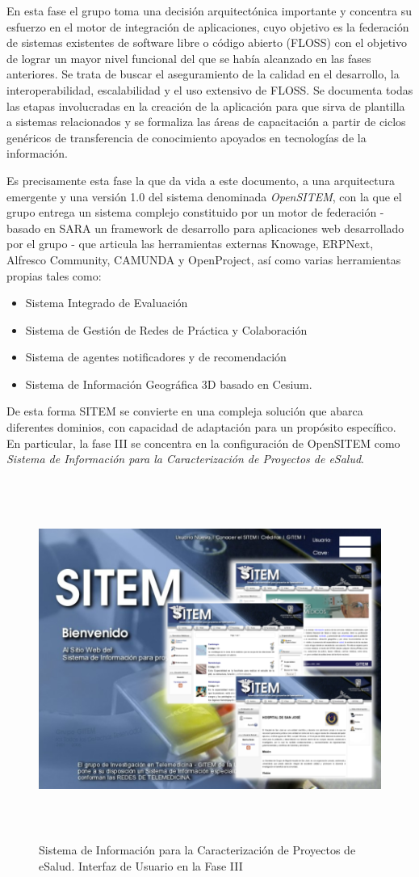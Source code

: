 En esta fase el grupo toma una decisión arquitectónica importante y concentra su esfuerzo en el motor de integración de aplicaciones, cuyo objetivo es la federación de sistemas existentes de software libre o código abierto (FLOSS) con el objetivo de lograr un mayor nivel funcional del que se había alcanzado en las fases anteriores. Se trata de buscar el aseguramiento de la calidad en el desarrollo, la interoperabilidad, escalabilidad y el uso extensivo de FLOSS. Se documenta todas las etapas involucradas en la creación de la aplicación para que sirva de plantilla a sistemas relacionados y se formaliza las áreas de capacitación a partir de ciclos genéricos de transferencia de conocimiento apoyados en tecnologías de la información.

Es precisamente esta fase la que da vida a este documento, a una arquitectura emergente y una versión 1.0 del sistema denominada \textit{OpenSITEM}, con la que el grupo entrega un sistema complejo constituido por un motor de federación - basado en SARA un framework de desarrollo para aplicaciones web desarrollado por el grupo - que articula las herramientas externas Knowage, ERPNext, Alfresco Community, CAMUNDA y OpenProject, así como varias herramientas propias tales como:

\begin{itemize}
\item Sistema Integrado de Evaluación
\item Sistema de Gestión de Redes de Práctica y Colaboración
\item Sistema de agentes notificadores y de recomendación
\item Sistema de Información Geográfica 3D basado en Cesium.
\end{itemize}

De esta forma SITEM se convierte en una compleja solución que abarca diferentes dominios, con capacidad de adaptación para un propósito específico. En particular, la fase III se concentra en la configuración de OpenSITEM como \textit{Sistema de Información para la Caracterización de Proyectos de eSalud}.


\begin{figure}
 \centering
 \includegraphics[width=156mm, height=118mm]{pagina_principal.png}
 \caption{Sistema de Información para la Caracterización de Proyectos de eSalud. Interfaz de Usuario en la Fase III}
 \label{sitem_faseIII}
\end{figure}